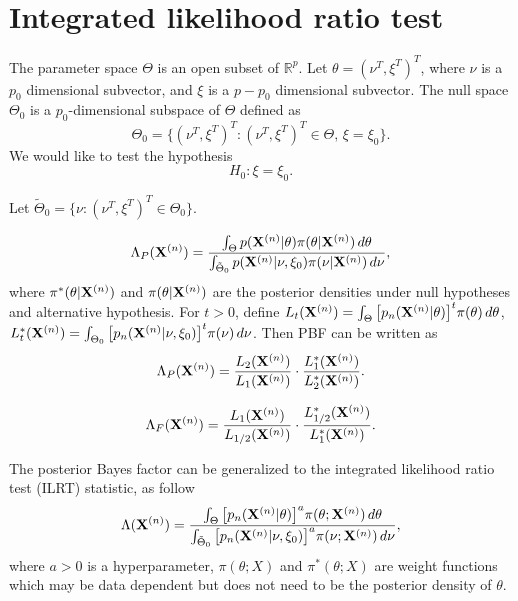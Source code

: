 \documentclass[3p]{elsarticle}
\theoremstyle{plain}
\theoremstyle{definition}
\theoremstyle{remark}
\begin{document}
\section{Integrated likelihood ratio test}
The parameter space $\Theta$ is an open subset of $\mathbb{R}^{p}$.
Let $\theta=(\nu^T,\xi^T)^T$, where $\nu$ is a $p_0$ dimensional subvector, and $\xi$ is a $p-p_0$ dimensional subvector.
The null space $\Theta_0$ is a $p_0$-dimensional subspace of $\Theta$ defined as
\begin{equation}
    \Theta_0=\{(\nu^T,\xi^T)^T:(\nu^T,\xi^T)^T\in\Theta, \, \xi=\xi_0\}.
\end{equation}
 We would like to test the hypothesis
\begin{equation}
H_0:\xi=\xi_0.
\end{equation}

Let $\tilde{\Theta}_0=\{\nu: (\nu^T,\xi^T)^T\in \Theta_0\}$.

\begin{equation*}
    \Lambda_{P}(\mathbf{X}^{(n)})=\frac{\int_{\Theta} p(\mathbf{X}^{(n)}|\theta)\pi(\theta|\mathbf{X}^{(n)})\, d\theta}{\int_{\tilde{\Theta}_0}p(\mathbf{X}^{(n)}|\nu,\xi_0)\pi(\nu|\mathbf{X}^{(n)})\, d\nu},
\end{equation*}
where $\pi^*(\theta|\mathbf{X}^{(n)})$ and $\pi(\theta|\mathbf{X}^{(n)})$ are the posterior densities under null hypotheses and alternative hypothesis.
For $t>0$, define $L_t(\mathbf{X}^{(n)})=\int_{\Theta}\big[p_n(\mathbf{X}^{(n)}|\theta)\big]^t \pi(\theta)\, d\theta$,
 $L_t^*(\mathbf{X}^{(n)})=\int_{\Theta_0}\big[p_n(\mathbf{X}^{(n)}|\nu,\xi_0)\big]^t \pi(\nu)\, d\nu$.
Then PBF can be written as
$$
    \Lambda_{P}(\mathbf{X}^{(n)})=
    \frac{L_{2}(\mathbf{X}^{(n)})}{L_{1}(\mathbf{X}^{(n)})}\cdot \frac{L_{1}^*(\mathbf{X}^{(n)})}{L_{2}^*(\mathbf{X}^{(n)})}.
$$

\begin{equation*}
    \Lambda_{F}(\mathbf{X}^{(n)})=
    \frac{L_{1}(\mathbf{X}^{(n)})}{L_{1/2}(\mathbf{X}^{(n)})}\cdot \frac{L_{1/2}^*(\mathbf{X}^{(n)})}{L_{1}^*(\mathbf{X}^{(n)})}.
\end{equation*}



 The posterior Bayes factor can be generalized to the integrated likelihood ratio test (ILRT) statistic, as follow  
\begin{equation}
    \Lambda (\mathbf{X}^{(n)})=\frac{\int_{\Theta} \big[p_n(\mathbf{X}^{(n)}|\theta)\big]^{a}\pi(\theta;\mathbf{X}^{(n)})\,d\theta}{\int_{\tilde{\Theta}_0} \big[p_n(\mathbf{X}^{(n)}|\nu,\xi_0)\big]^{a}\pi(\nu;\mathbf{X}^{(n)})\,d\nu},
\end{equation}
where $a>0$ is a hyperparameter, $\pi(\theta;X)$ and $\pi^*(\theta;X)$ are weight functions which may be data dependent but does not need to be the posterior density of $\theta$.
\end{document}
